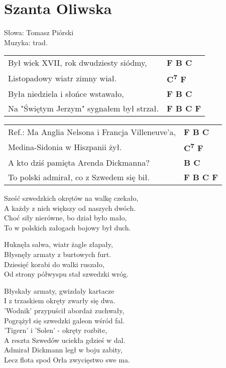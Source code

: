 \section{Szanta Oliwska}

Słowa: Tomasz Piórski\\
Muzyka:  trad.

\vspace{2em}
\begin{tabular}{@{}p{8cm}@{}l@{}}
Był wiek XVII, rok dwudziesty siódmy, & \bfseries F B C \\
Listopadowy wiatr zimny wiał. & \bfseries C\textsuperscript{7} F \\
Była niedziela i słońce wstawało, & \bfseries F B C \\
Na "Świętym Jerzym" sygnałem był strzał. & \bfseries F B C F \\
\end{tabular}

\vspace{1em}
\begin{tabular}{@{}p{8cm}@{}l@{}}
Ref.: Ma Anglia Nelsona i Francja Villeneuve'a, & \bfseries F B C \\
Medina-Sidonia w Hiszpanii żył. & \bfseries C\textsuperscript{7} F \\
A kto dziś pamięta Arenda Dickmanna? & \bfseries B C \\
To polski admirał, co z Szwedem się bił. & \bfseries F B C F \\
\end{tabular}

\vspace{1em}
Sześć szwedzkich okrętów na walkę czekało, \\
A każdy z nich większy od naszych dwóch. \\
Choć siły nierówne, bo dział było mało, \\
To w polskich załogach bojowy był duch. \\

\begin{multicols}{2}
Huknęła salwa, wiatr żagle złapały, \\
Błysnęły armaty z burtowych furt. \\
Dziesięć korabi do walki ruszało, \\
Od strony półwyspu stał szwedzki wróg. \\
\columnbreak

Błyskały armaty, gwizdały kartacze \\
I z trzaskiem okręty zwarły się dwa. \\
'Wodnik' przypuścił abordaż zuchwały, \\
Pogrążył się szwedzki galeon wśród fal. \\

'Tigern' i 'Solen' - okręty rozbite, \\
A reszta Szwedów uciekła gdzieś w dal. \\
Admirał Dickmann legł w boju zabity, \\
Lecz flota spod Orła zwycięstwo swe ma. \\
\end{multicols}
